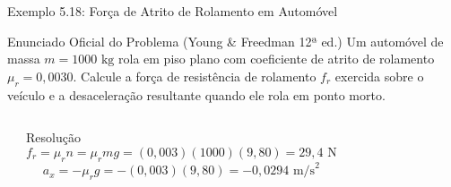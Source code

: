 \documentclass[10pt,aspectratio=169]{beamer}
\begin{document}
\begin{frame}{Exemplo 5.18: Força de Atrito de Rolamento em Automóvel}
    \begin{block}{Enunciado Oficial do Problema (Young \& Freedman 12ª ed.)}
        \small
        Um automóvel de massa $m = 1000\text{ kg}$ rola em piso plano com coeficiente de atrito de rolamento $\mu_r = 0{,}0030$. Calcule a força de resistência de rolamento $f_r$ exercida sobre o veículo e a desaceleração resultante quando ele rola em ponto morto.
    \end{block}
    \begin{columns}[T]
        \begin{center}
        \end{center}
        \begin{exampleblock}{Resolução}
            \small
            $$f_r = \mu_r n = \mu_r mg = (0{,}003)(1000)(9{,}80) = 29{,}4\text{ N}$$
            $$a_x = -\mu_r g = -(0{,}003)(9{,}80) = -0{,}0294\text{ m/s}^2$$
        \end{exampleblock}
    \end{columns}
\end{frame}
\end{document}
